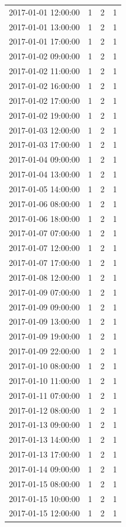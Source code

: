 \begin{tabular}{lrrr}
2017-01-01 12:00:00 & 1 & 2 & 1 \\
2017-01-01 13:00:00 & 1 & 2 & 1 \\
2017-01-01 17:00:00 & 1 & 2 & 1 \\
2017-01-02 09:00:00 & 1 & 2 & 1 \\
2017-01-02 11:00:00 & 1 & 2 & 1 \\
2017-01-02 16:00:00 & 1 & 2 & 1 \\
2017-01-02 17:00:00 & 1 & 2 & 1 \\
2017-01-02 19:00:00 & 1 & 2 & 1 \\
2017-01-03 12:00:00 & 1 & 2 & 1 \\
2017-01-03 17:00:00 & 1 & 2 & 1 \\
2017-01-04 09:00:00 & 1 & 2 & 1 \\
2017-01-04 13:00:00 & 1 & 2 & 1 \\
2017-01-05 14:00:00 & 1 & 2 & 1 \\
2017-01-06 08:00:00 & 1 & 2 & 1 \\
2017-01-06 18:00:00 & 1 & 2 & 1 \\
2017-01-07 07:00:00 & 1 & 2 & 1 \\
2017-01-07 12:00:00 & 1 & 2 & 1 \\
2017-01-07 17:00:00 & 1 & 2 & 1 \\
2017-01-08 12:00:00 & 1 & 2 & 1 \\
2017-01-09 07:00:00 & 1 & 2 & 1 \\
2017-01-09 09:00:00 & 1 & 2 & 1 \\
2017-01-09 13:00:00 & 1 & 2 & 1 \\
2017-01-09 19:00:00 & 1 & 2 & 1 \\
2017-01-09 22:00:00 & 1 & 2 & 1 \\
2017-01-10 08:00:00 & 1 & 2 & 1 \\
2017-01-10 11:00:00 & 1 & 2 & 1 \\
2017-01-11 07:00:00 & 1 & 2 & 1 \\
2017-01-12 08:00:00 & 1 & 2 & 1 \\
2017-01-13 09:00:00 & 1 & 2 & 1 \\
2017-01-13 14:00:00 & 1 & 2 & 1 \\
2017-01-13 17:00:00 & 1 & 2 & 1 \\
2017-01-14 09:00:00 & 1 & 2 & 1 \\
2017-01-15 08:00:00 & 1 & 2 & 1 \\
2017-01-15 10:00:00 & 1 & 2 & 1 \\
2017-01-15 12:00:00 & 1 & 2 & 1 \\

\end{tabular}
